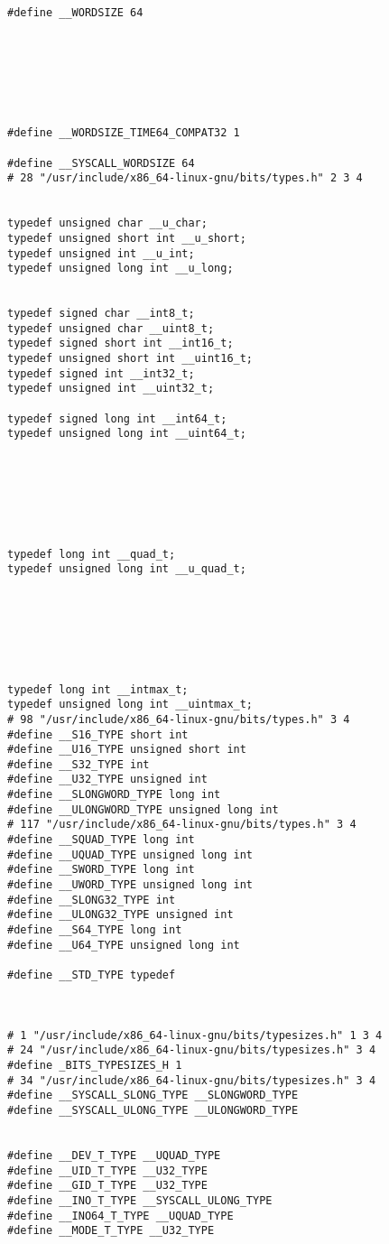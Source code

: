 \documentclass[11pt]{article}
\begin{document}
\begin{enumerate}
\begin{verbatim}
#define __WORDSIZE 64







#define __WORDSIZE_TIME64_COMPAT32 1

#define __SYSCALL_WORDSIZE 64
# 28 "/usr/include/x86_64-linux-gnu/bits/types.h" 2 3 4


typedef unsigned char __u_char;
typedef unsigned short int __u_short;
typedef unsigned int __u_int;
typedef unsigned long int __u_long;


typedef signed char __int8_t;
typedef unsigned char __uint8_t;
typedef signed short int __int16_t;
typedef unsigned short int __uint16_t;
typedef signed int __int32_t;
typedef unsigned int __uint32_t;

typedef signed long int __int64_t;
typedef unsigned long int __uint64_t;







typedef long int __quad_t;
typedef unsigned long int __u_quad_t;







typedef long int __intmax_t;
typedef unsigned long int __uintmax_t;
# 98 "/usr/include/x86_64-linux-gnu/bits/types.h" 3 4
#define __S16_TYPE short int
#define __U16_TYPE unsigned short int
#define __S32_TYPE int
#define __U32_TYPE unsigned int
#define __SLONGWORD_TYPE long int
#define __ULONGWORD_TYPE unsigned long int
# 117 "/usr/include/x86_64-linux-gnu/bits/types.h" 3 4
#define __SQUAD_TYPE long int
#define __UQUAD_TYPE unsigned long int
#define __SWORD_TYPE long int
#define __UWORD_TYPE unsigned long int
#define __SLONG32_TYPE int
#define __ULONG32_TYPE unsigned int
#define __S64_TYPE long int
#define __U64_TYPE unsigned long int

#define __STD_TYPE typedef



# 1 "/usr/include/x86_64-linux-gnu/bits/typesizes.h" 1 3 4
# 24 "/usr/include/x86_64-linux-gnu/bits/typesizes.h" 3 4
#define _BITS_TYPESIZES_H 1
# 34 "/usr/include/x86_64-linux-gnu/bits/typesizes.h" 3 4
#define __SYSCALL_SLONG_TYPE __SLONGWORD_TYPE
#define __SYSCALL_ULONG_TYPE __ULONGWORD_TYPE


#define __DEV_T_TYPE __UQUAD_TYPE
#define __UID_T_TYPE __U32_TYPE
#define __GID_T_TYPE __U32_TYPE
#define __INO_T_TYPE __SYSCALL_ULONG_TYPE
#define __INO64_T_TYPE __UQUAD_TYPE
#define __MODE_T_TYPE __U32_TYPE


\end{verbatim}
\end{enumerate}
\end{document}
